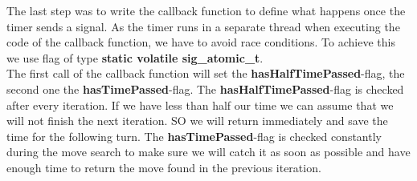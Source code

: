 The last step was to write the callback function to define what happens once the timer sends a signal.
As the timer runs in a separate thread when executing the code of the callback function, we have to avoid race conditions. 
To achieve this we use flag of type \textbf{static volatile sig\_atomic\_t}.\\

The first call of the callback function will set the \textbf{hasHalfTimePassed}-flag, the second one the \textbf{hasTimePassed}-flag.
The \textbf{hasHalfTimePassed}-flag is checked after every iteration. If we have less than half our time we can assume that we will not finish the next iteration. SO we will return immediately and save the time for the following turn.
The \textbf{hasTimePassed}-flag is checked constantly during the move search to make sure we will catch it as soon as possible and have enough time to return the move found in the previous iteration.



